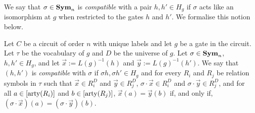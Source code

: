 \documentclass[../paper.tex]{subfiles}
\begin{document}



We say that $\sigma \in \text{\textbf{Sym}}_n$ is \emph{compatible} with a pair $h, h' \in H_g$
if $\sigma$ acts like an isomorphism at $g$ when restricted to the gates $h$ and
$h'$. We formalise this notion below.

\begin{definition}
  Let $C$ be a circuit of order $n$ with unique labels and let $g$ be a gate in
  the circuit. Let $\tau$ be the vocabulary of $g$ and $D$ be the universe of
  $g$. Let $\sigma \in \text{\textbf{Sym}}_n$, $h, h' \in H_g$, and let $\vec{x} :=
  L(g)^{-1}(h)$ and $\vec{y} := L(g)^{-1}(h')$. We say that $(h, h')$ is
  \emph{compatible} with $\sigma$ if $\sigma h, \sigma h' \in H_g$ and for every
  $R_i$ and $R_j$ be relation symbols in $\tau$ such that $\vec{x} \in R^{D}_i$
  and $\vec{y} \in R^{D}_j$, $\sigma \cdot \vec{x} \in R^{D}_i$ and $\sigma
  \cdot \vec{y} \in R^D_j$, and for all $a \in [\mathrm{arty}(R_i)]$ and $b \in
  [\mathrm{arty}(R_j)]$, $\vec{x}(a) = \vec{y}(b)$ if, and only if, $(\sigma \cdot
  \vec{x})(a) = (\sigma \cdot \vec{y})(b)$.
\end{definition}
\end{document}
